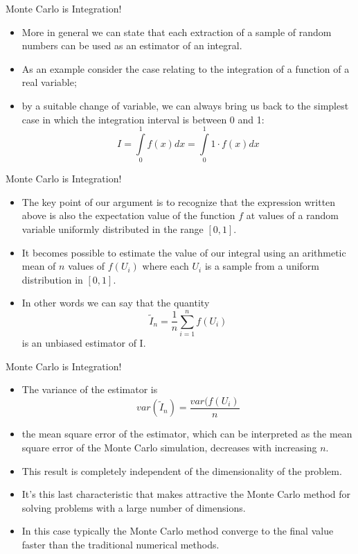 \documentclass[11pt]{beamer}
\newcommand*{\itemimg}[1]{%
  \raisebox{-.3\baselineskip}{%
    \texttt{[image: \#1]}%
  }%
}
\begin{document}
\begin{frame}{Monte Carlo is Integration!}
\begin{itemize}
\item More in general we can state that each extraction of a sample of random numbers can be used as an estimator of an integral. 
\item As an example consider the case relating to the integration of a function of a real variable; 
\item by a suitable change of variable, we can always bring us back to the simplest case in which the integration interval is between 0 and 1:
$$I = \int\limits_0^1 f(x)dx = \int\limits_0^1 1 \cdot f(x)dx$$
\end{itemize}
\end{frame}
\begin{frame}{Monte Carlo is Integration!}
\begin{itemize}
\item The key point of our argument is to recognize that the expression written above is also the expectation value of the function $f$ at values of a random variable uniformly distributed in the range $[0, 1]$. 
\item It becomes possible to estimate the value of our integral using an arithmetic mean of $n$ values of $f (U_i)$ where each $U_i$ is a sample from a uniform distribution in $[0, 1]$. 
\item In other words we can say that the quantity
$$
\tilde{I}_n = \frac{1}{n} \sum\limits_{i=1}^n f(U_i)
$$
is an unbiased estimator of I.
\end{itemize}
\end{frame}
\begin{frame}{Monte Carlo is Integration!}
\begin{itemize}
\item  The variance of the estimator is
$$ var \left( \tilde{I}_n \right) = \frac{var(f(U_i)}{n} $$
\item the mean square error of the estimator, which can be interpreted as the mean square error of the Monte Carlo simulation, decreases with increasing $n$. 
\item [\itemimg{./img/key_point.jpg}] This result is completely independent of the dimensionality of the problem. 
\item [\itemimg{./img/key_point.jpg}] It's this last characteristic that makes attractive the Monte Carlo method for solving problems with a large number of dimensions. 
\item In this case typically the Monte Carlo method converge to the final value faster than the traditional numerical methods.
\end{itemize}
\end{frame}
\end{document}
